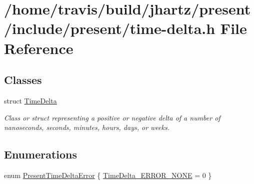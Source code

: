 \hypertarget{time-delta_8h}{\section{/home/travis/build/jhartz/present/include/present/time-\/delta.h \-File \-Reference}
\label{time-delta_8h}
}
\subsection*{\-Classes}
\begin{DoxyCompactItemize}
\item 
struct \hyperlink{structTimeDelta}{\-Time\-Delta}
\begin{DoxyCompactList}\small\item\em \-Class or struct representing a positive or negative delta of a number of nanoseconds, seconds, minutes, hours, days, or weeks. \end{DoxyCompactList}\end{DoxyCompactItemize}
\subsection*{\-Enumerations}
\begin{DoxyCompactItemize}
\item 
enum \hyperlink{time-delta_8h_a6090105e9137c36754994cda35937b59}{\-Present\-Time\-Delta\-Error} \{ \hyperlink{time-delta_8h_a6090105e9137c36754994cda35937b59a61286fb07f463a3add14112870d9f834}{\-Time\-Delta\-\_\-\-E\-R\-R\-O\-R\-\_\-\-N\-O\-N\-E} =  0
 \}
\end{DoxyCompactItemize}
